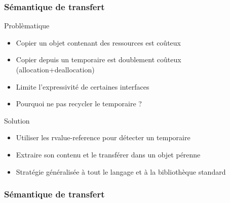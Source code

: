 \documentclass[svgnames]{beamer}
\begin{document}
\frame
{
  \frametitle{Sémantique de transfert}
  \begin{block}{Problèmatique}
  \begin{itemize}
  \footnotesize
  \item Copier un objet contenant des ressources est coûteux
  \item Copier depuis un temporaire est doublement coûteux (allocation+deallocation)
  \item Limite l'expressivité de certaines interfaces
  \item Pourquoi ne pas recycler le temporaire ?
  \end{itemize}
  \end{block}

  \begin{block}{Solution}
  \begin{itemize}
  \item Utiliser les rvalue-reference pour détecter un temporaire
  \item Extraire son contenu et le \alert{transf\'erer} dans un objet pérenne
  \item Stratégie généralisée à tout le langage et \`a la biblioth\`eque standard
  \end{itemize}
  \end{block}
}

\frame
{
  \frametitle{Sémantique de transfert}
  
}
\end{document}
